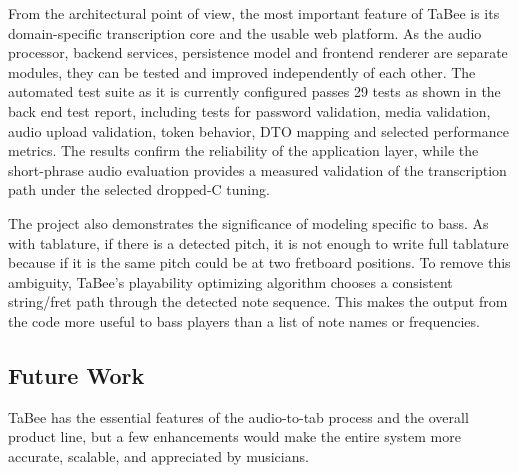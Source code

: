 \documentclass[a4paper, 12pt, titlepage]{article}
\begin{document}
From the architectural point of view, the most important feature of TaBee is its domain-specific transcription core and the usable web platform. As the audio processor, backend services, persistence model and frontend renderer are separate modules, they can be tested and improved independently of each other. The automated test suite as it is currently configured passes 29 tests as shown in the back end test report, including tests for password validation, media validation, audio upload validation, token behavior, DTO mapping and selected performance metrics. The results confirm the reliability of the application layer, while the short-phrase audio evaluation provides a measured validation of the transcription path under the selected dropped-C tuning.

The project also demonstrates the significance of modeling specific to bass. As with tablature, if there is a detected pitch, it is not enough to write full tablature because if it is the same pitch could be at two fretboard positions. To remove this ambiguity, TaBee's playability optimizing algorithm chooses a consistent string/fret path through the detected note sequence. This makes the output from the code more useful to bass players than a list of note names or frequencies.

\subsection{Future Work}
TaBee has the essential features of the audio-to-tab process and the overall product line, but a few enhancements would make the entire system more accurate, scalable, and appreciated by musicians.
\end{document}

